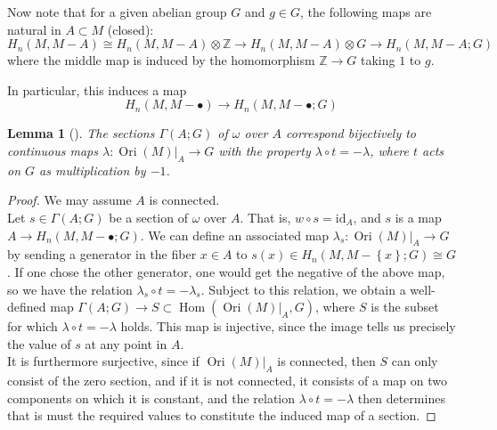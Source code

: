 \documentclass[reqno]{amsart}
\newtheorem{lemma}[theorem]{Lemma}
\theoremstyle{definition}
\theoremstyle{remark}
\DeclareMathOperator{\Hom}{Hom}
\DeclareMathOperator{\Ori}{Ori}
\newcommand{\id}{{\mathrm{id}}}
\begin{document}
Now note that for a given abelian group $G$ and
$g \in G$, the following maps are natural in
$A \subset M$ (closed):
\[
H_n(M, M- A) \cong H_n \left( M, M- A \right) \otimes
\mathbb{Z} \to H_n(M, M-A) \otimes G
\to H_n(M, M-A;G)
\] 
where the middle map is induced by the homomorphism
$\mathbb{Z} \to G$ taking $1$ to $g$.

In particular, this induces a map
\[
H_n(M, M - \bullet) \to 
H_n(M, M - \bullet; G)
\] 

\begin{lemma}[]\label{Lemma:X2948JJD}\cite{Dieck}
    The sections $\Gamma (A;G)$ of $\omega$ over
    $A$ correspond bijectively to continuous maps
    $\lambda \colon \Ori \left( M \right)|_{A} \to G$ with
    the property $\lambda \circ t = - \lambda$, where
    $t$ acts on $G$ as multiplication by $-1$.
\end{lemma}

\begin{proof}
    We may assume $A$ is connected.\\
    Let $s \in \Gamma \left( A;G \right) $ be a section
    of $\omega$ over $A$. That is, 
    $w \circ s = \id_A$, and
    $s$ is a map $A \to H_n (M, M - \bullet;G)$. We
    can define an associated map
    $\lambda_s \colon \Ori (M)|_{A} \to G$ by
    sending a generator in the fiber $x \in A$ to
    $s(x) \in 
    H_n \left( M, M - \left\{ x \right\} ;G \right) 
    \cong G$. If one chose the other generator, one
    would get the negative of the above map, so
    we have the relation
    $\lambda_s \circ t = - \lambda_s$. Subject to this relation,
    we obtain a well-defined map
    $\Gamma \left( A;G \right) \to 
    S \subset \Hom \left( \Ori \left( M \right) |_A , G \right) $,
    where $S$ is the subset for which
    $\lambda \circ t = - \lambda$ holds.
    This map is injective, since
    the image tells us precisely the value of
    $s$ at any point in $A$.\\
    It is furthermore surjective, since if
    $\Ori(M)|_A$ is connected, then 
    $S$ can only consist of the zero section, and
    if it is not connected, it consists of a map on two
    components on which it is constant, and the
    relation $\lambda \circ t = - \lambda$ then
    determines that is must the required values
    to constitute the induced map of a section.
\end{proof}
\end{document}
